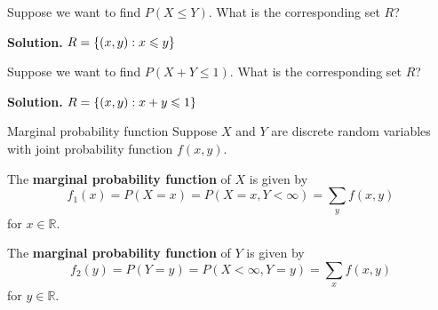\begin{Example}{}{}
    Suppose we want to find $ P(X\leqslant Y) $. What is the
    corresponding set $ R $?

    \textbf{Solution.} $ R=\{(x,y):x\leqslant y\} $

    Suppose we want to find $ P(X+Y\leqslant 1) $. What is the corresponding
    set $ R $?

    \textbf{Solution.} $ R=\{(x,y):x+y\leqslant 1\} $
\end{Example}

\begin{Definition}{Marginal probability function}{}
    Suppose $ X $ and $ Y $ are discrete
    random variables with joint probability
    function $ f(x,y) $.

    The \textbf{marginal probability
        function} of $ X $ is given by
    \[ f_1(x)=P(X=x)=P(X=x,Y<\infty)=\sum\limits_{y}f(x,y)  \]
    for $ x\in\mathbb{R} $.

    The \textbf{marginal probability function} of $ Y $
    is given by
    \[ f_2(y)=P(Y=y)=P(X<\infty,Y=y)=\sum\limits_{x}f(x,y)  \]
    for $ y\in\mathbb{R} $.
\end{Definition}


